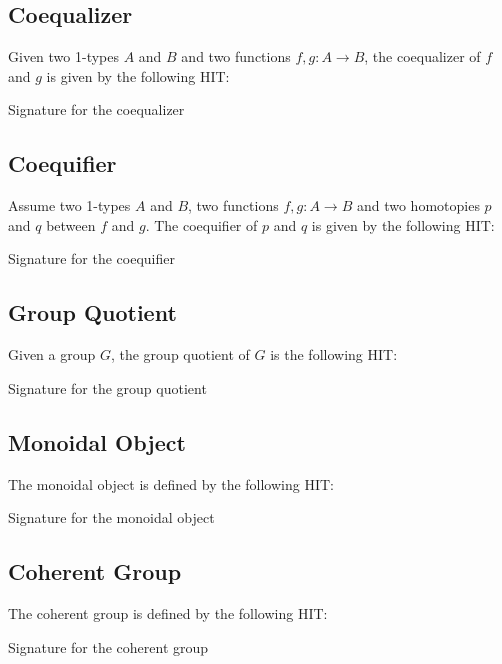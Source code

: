 \subsection{Coequalizer}
\label{sec:coequalizer}

Given two 1-types $A$ and $B$ and two functions $f , g: A \to B$, the
coequalizer of $f$ and $g$ is given by the following HIT:

Signature for the coequalizer

\subsection{Coequifier}
\label{sec:coequifier}

Assume two 1-types $A$ and $B$, two functions $f , g: A \to B$ and two
homotopies $p$ and $q$ between $f$ and $g$. The coequifier of $p$ and
$q$ is given by the following HIT:

Signature for the coequifier

\subsection{Group Quotient}
\label{sec:group_quotient}

Given a group $G$, the group quotient of $G$ is the following HIT:

Signature for the group quotient

\subsection{Monoidal Object}
\label{sec:monoidal_object}

The monoidal object is defined by the following HIT:

Signature for the monoidal object

\subsection{Coherent Group}
\label{sec:coeherent_group}

The coherent group is defined by the following HIT:

Signature for the coherent group
